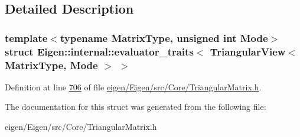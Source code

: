\subsection{Detailed Description}
\subsubsection*{template$<$typename Matrix\+Type, unsigned int Mode$>$\newline
struct Eigen\+::internal\+::evaluator\+\_\+traits$<$ Triangular\+View$<$ Matrix\+Type, Mode $>$ $>$}



Definition at line \hyperlink{eigen_2_eigen_2src_2_core_2_triangular_matrix_8h_source_l00706}{706} of file \hyperlink{eigen_2_eigen_2src_2_core_2_triangular_matrix_8h_source}{eigen/\+Eigen/src/\+Core/\+Triangular\+Matrix.\+h}.



The documentation for this struct was generated from the following file\+:\begin{DoxyCompactItemize}
\item 
eigen/\+Eigen/src/\+Core/\+Triangular\+Matrix.\+h\end{DoxyCompactItemize}
